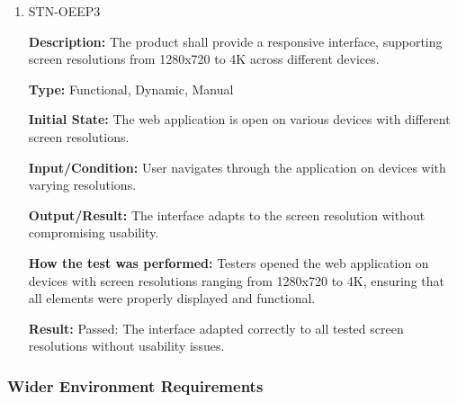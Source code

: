 \documentclass[12pt, titlepage]{article}
\begin{document}
\begin{enumerate}
\textbf{Result:} Passed: The application performed efficiently, with no significant delays observed across different performance monitoring methods.

\item{STN-OEEP3}

\textbf{Description:} The product shall provide a responsive interface, supporting screen resolutions from 1280x720 to 4K across different devices.

\textbf{Type:} Functional, Dynamic, Manual

\textbf{Initial State:} The web application is open on various devices with different screen resolutions.

\textbf{Input/Condition:} User navigates through the application on devices with varying resolutions.

\textbf{Output/Result:} The interface adapts to the screen resolution without compromising usability.

\textbf{How the test was performed:} Testers opened the web application on devices with screen resolutions ranging from 1280x720 to 4K, ensuring that all elements were properly displayed and functional.

\textbf{Result:} Passed: The interface adapted correctly to all tested screen resolutions without usability issues.

\end{enumerate}

\subsubsection{Wider Environment Requirements}
\end{document}
